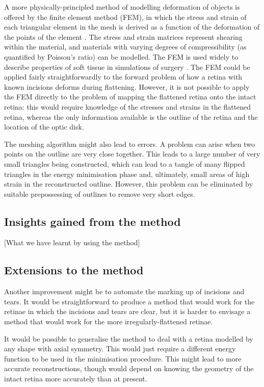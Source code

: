 \documentclass[10pt]{article}
\newcommand{\todo}[1]{{\color{red}[#1]}}
\begin{document}
A more physically-principled method of modelling deformation of
objects is offered by the finite element method (FEM), in which the
stress and strain of each triangular element in the mesh is derived as
a function of the deformation of the points of the element
\cite{ZienTayl00fini}. The stress and strain matrices represent
shearing within the material, and materials with varying degrees of
compressibility (as quantified by Poisson's ratio) can be modelled.
The FEM is used widely to describe properties of soft tissue in
simulations of surgery \cite{CartEtal05appl}. The FEM could be applied
fairly straightforwardly to the forward problem of how a retina with
known incisions deforms during flattening. However, it is not possible
to apply the FEM directly to the problem of mapping the flattened
retina onto the intact retina: this would require knowledge of the
stresses and strains in the flattened retina, whereas the only
information available is the outline of the retina and the location of
the optic disk.

The meshing algorithm might also lead to errors. A problem can arise
when two points on the outline are very close together. This leads to
a large number of very small triangles being constructed, which can
lead to a tangle of many flipped triangles in the energy minimisation
phase and, ultimately, small areas of high strain in the reconstructed
outline. However, this problem can be eliminated by suitable
prepossessing of outlines to remove very short edges.

\subsection*{Insights gained from the method}

\todo{What we have learnt by using the method}

\subsection*{Extensions to the method}

Another improvement might be to automate the marking up of incisions
and tears. It would be straightforward to produce a method that would
work for the retinae in which the incisions and tears are clear, but
it is harder to envisage a method that would work for the more
irregularly-flattened retinae.

It would be possible to generalise the method to deal with a retina
modelled by any shape with axial symmetry. This would just require a
different energy function to be used in the minimisation
procedure. This might lead to more accurate reconstructions, though
would depend on knowing the geometry of the intact retina more
accurately than at present.
\end{document}
